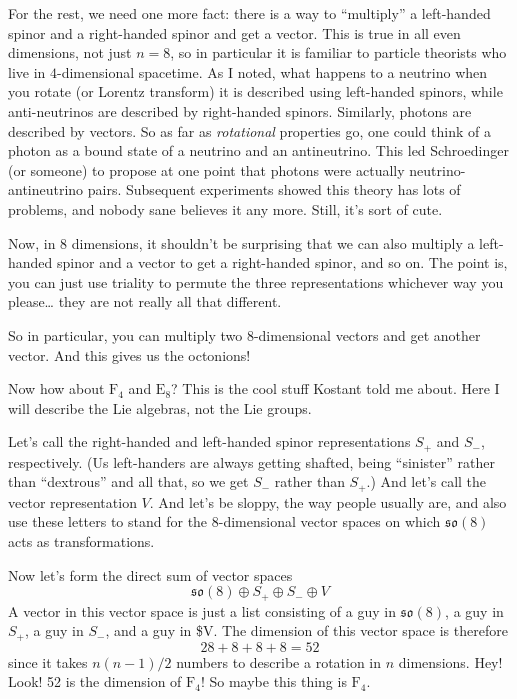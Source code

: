 \documentclass{article}
\begin{document}
For the rest, we need one more fact: there is a way to ``multiply'' a
left-handed spinor and a right-handed spinor and get a vector. This is
true in all even dimensions, not just \(n = 8\), so in particular it is
familiar to particle theorists who live in \(4\)-dimensional spacetime.
As I noted, what happens to a neutrino when you rotate (or Lorentz
transform) it is described using left-handed spinors, while
anti-neutrinos are described by right-handed spinors. Similarly, photons
are described by vectors. So as far as \emph{rotational} properties go,
one could think of a photon as a bound state of a neutrino and an
antineutrino. This led Schroedinger (or someone) to propose at one point
that photons were actually neutrino- antineutrino pairs. Subsequent
experiments showed this theory has lots of problems, and nobody sane
believes it any more. Still, it's sort of cute.

Now, in 8 dimensions, it shouldn't be surprising that we can also
multiply a left-handed spinor and a vector to get a right-handed spinor,
and so on. The point is, you can just use triality to permute the three
representations whichever way you please\ldots{} they are not really all
that different.

So in particular, you can multiply two \(8\)-dimensional vectors and get
another vector. And this gives us the octonions!

Now how about \(\mathrm{F}_4\) and \(\mathrm{E}_8\)? This is the cool
stuff Kostant told me about. Here I will describe the Lie algebras, not
the Lie groups.

Let's call the right-handed and left-handed spinor representations
\(S_+\) and \(S_-\), respectively. (Us left-handers are always getting
shafted, being ``sinister'' rather than ``dextrous'' and all that, so we
get \(S_-\) rather than \(S_+\).) And let's call the vector
representation \(V\). And let's be sloppy, the way people usually are,
and also use these letters to stand for the \(8\)-dimensional vector
spaces on which \(\mathfrak{so}(8)\) acts as transformations.

Now let's form the direct sum of vector spaces
\[\mathfrak{so}(8)\oplus S_+ \oplus S_- \oplus V\] A vector in this
vector space is just a list consisting of a guy in \(\mathfrak{so}(8)\),
a guy in \(S_+\), a guy in \(S_-\), and a guy in \$V. The dimension of
this vector space is therefore \[28+8+8+8=52\] since it takes
\(n(n-1)/2\) numbers to describe a rotation in \(n\) dimensions. Hey!
Look! 52 is the dimension of \(\mathrm{F}_4\)! So maybe this thing is
\(\mathrm{F}_4\).
\end{document}
